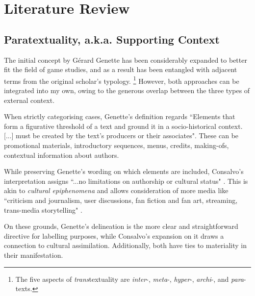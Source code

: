 \documentclass[12pt,oneside]{book}
\begin{document}
\chapter{Literature Review}
    \vfill
\section{Paratextuality, a.k.a. Supporting Context}  
    The initial concept by G\'{e}rard Genette \parencite*{genette} has been considerably expanded to better fit the field of game studies, and as a result has been entangled with adjacent terms from the original scholar's typology.
    \footnote{The five aspects of \textit{trans}textuality are \textit{inter}-, \textit{meta}-, \textit{hyper}-, \textit{archi}-, and \textit{para}-texts.}
    However, both approaches can be integrated into my own, owing to the generous overlap between the three types of external context.\par
    When strictly categorising cases, Genette's definition regards 
    ``Elements that form a figurative threshold of a text and ground it in a socio-historical context. [...] must be created by the text’s producers or their associates".
    These can be promotional materials, introductory sequences, menus, credits, making-ofs, contextual information about authors.\par
    While preserving Genette's wording on which elements are included, Consalvo's interpretation assigns ``...no limitations on authorship or cultural status" \parencite*{consalvo}. 
    This is akin to \textit{cultural epiphenomena} and allows consideration of more media like ``criticism and journalism, user discussions, fan fiction and fan art, streaming, trans-media storytelling" \parencite{svelch}.\par
    On these grounds, Genette's delineation is the more clear and straightforward directive for labelling purposes, while Consalvo's expansion on it draws a connection to cultural assimilation.
    Additionally, both have ties to materiality in their manifestation.
\end{document}
